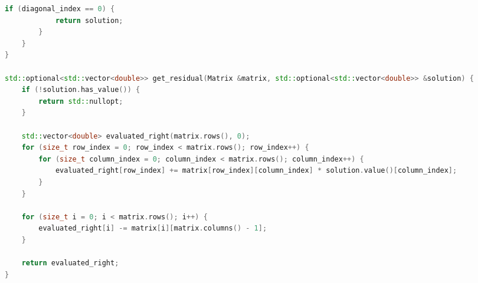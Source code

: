 \documentclass[12pt]{article}
\begin{document}
\begin{adjustbox}{width=\textwidth, center}
\begin{lstlisting}[language=C++, caption=main.cpp]
        if (diagonal_index == 0) {
            return solution;
        }
    }
}

std::optional<std::vector<double>> get_residual(Matrix &matrix, std::optional<std::vector<double>> &solution) {
    if (!solution.has_value()) {
        return std::nullopt;
    }

    std::vector<double> evaluated_right(matrix.rows(), 0);
    for (size_t row_index = 0; row_index < matrix.rows(); row_index++) {
        for (size_t column_index = 0; column_index < matrix.rows(); column_index++) {
            evaluated_right[row_index] += matrix[row_index][column_index] * solution.value()[column_index];
        }
    }

    for (size_t i = 0; i < matrix.rows(); i++) {
        evaluated_right[i] -= matrix[i][matrix.columns() - 1];
    }

    return evaluated_right;
}
\end{lstlisting}
\end{adjustbox}
\end{document}
